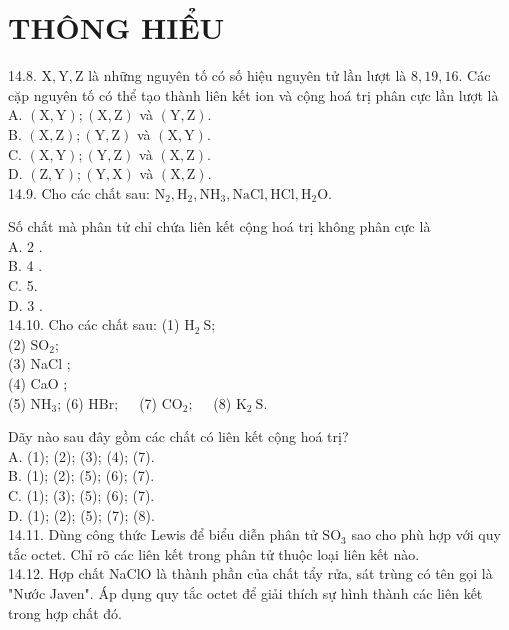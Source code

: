 \documentclass[10pt]{article}
\begin{document}
\section*{THÔNG HIỂU}
14.8. $\mathrm{X}, \mathrm{Y}, \mathrm{Z}$ là những nguyên tố có số hiệu nguyên tử lần lượt là $8,19,16$. Các cặp nguyên tố có thể tạo thành liên kết ion và cộng hoá trị phân cực lần lượt là\\
A. $(\mathrm{X}, \mathrm{Y}) ;(\mathrm{X}, \mathrm{Z})$ và $(\mathrm{Y}, \mathrm{Z})$.\\
B. $(\mathrm{X}, \mathrm{Z}) ;(\mathrm{Y}, \mathrm{Z})$ và $(\mathrm{X}, \mathrm{Y})$.\\
C. $(\mathrm{X}, \mathrm{Y}) ;(\mathrm{Y}, \mathrm{Z})$ và $(\mathrm{X}, \mathrm{Z})$.\\
D. $(\mathrm{Z}, \mathrm{Y}) ;(\mathrm{Y}, \mathrm{X})$ và $(\mathrm{X}, \mathrm{Z})$.\\
14.9. Cho các chất sau: $\mathrm{N}_{2}, \mathrm{H}_{2}, \mathrm{NH}_{3}, \mathrm{NaCl}, \mathrm{HCl}, \mathrm{H}_{2} \mathrm{O}$.

Số chất mà phân tử chỉ chứa liên kết cộng hoá trị không phân cực là\\
A. 2 .\\
B. 4 .\\
C. 5.\\
D. 3 .\\
14.10. Cho các chất sau: (1) $\mathrm{H}_{2} \mathrm{~S}$;\\
(2) $\mathrm{SO}_{2}$;\\
(3) NaCl ;\\
(4) CaO ;\\
(5) $\mathrm{NH}_{3}$; (6) $\mathrm{HBr} ; \quad$ (7) $\mathrm{CO}_{2} ; \quad$ (8) $\mathrm{K}_{2} \mathrm{~S}$.

Dãy nào sau đây gồm các chất có liên kết cộng hoá trị?\\
A. (1); (2); (3); (4); (7).\\
B. (1); (2); (5); (6); (7).\\
C. (1); (3); (5); (6); (7).\\
D. (1); (2); (5); (7); (8).\\
14.11. Dùng công thức Lewis để biểu diễn phân tử $\mathrm{SO}_{3}$ sao cho phù hợp với quy tắc octet. Chỉ rõ các liên kết trong phân tử thuộc loại liên kết nào.\\
14.12. Hợp chất NaClO là thành phần của chất tẩy rửa, sát trùng có tên gọi là "Nước Javen". Áp dụng quy tắc octet để giải thích sự hình thành các liên kết trong hợp chất đó.
\end{document}

